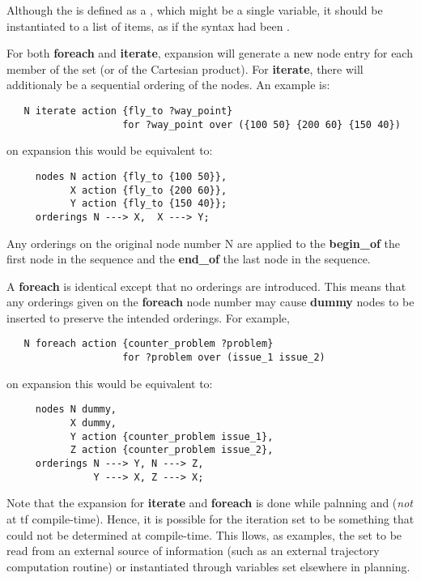 Although the  is defined as a ,
which might be a single variable, it should be instantiated to a list
of items, as if the syntax had been .

For both {\bf foreach} and {\bf iterate}, expansion will generate a
new node entry for each member of the set (or of the Cartesian
product).  For {\bf iterate}, there will additionaly be a sequential
ordering of the nodes.  An example is:

\begin{verbatim}
   N iterate action {fly_to ?way_point}
                    for ?way_point over ({100 50} {200 60} {150 40})
\end{verbatim}
on expansion this would be equivalent to:
\begin{verbatim}
     nodes N action {fly_to {100 50}},
           X action {fly_to {200 60}},
           Y action {fly_to {150 40}};
     orderings N ---> X,  X ---> Y;
\end{verbatim}

Any orderings on the original node number N are applied to the
{\bf begin\_of} the first node in the sequence and the {\bf end\_of} the
last node in the sequence.

A {\bf foreach} is identical except that no orderings are introduced.
This means that any orderings given on the {\bf foreach} node number may
cause {\bf dummy} nodes to be inserted to preserve the intended orderings.
For example,

\begin{verbatim}
   N foreach action {counter_problem ?problem}
                    for ?problem over (issue_1 issue_2)
\end{verbatim}
on expansion this would be equivalent to:
\begin{verbatim}
     nodes N dummy,
           X dummy,
           Y action {counter_problem issue_1},
           Z action {counter_problem issue_2},
     orderings N ---> Y, N ---> Z,
               Y ---> X, Z ---> X;
\end{verbatim}

Note that the expansion for {\bf iterate} and {\bf foreach} is done
while palnning and ({\em not} at {\sc tf} compile-time).  Hence, it is
possible for the iteration set to be something that could not be
determined at compile-time.  This llows, as examples, the set
to be read from an external source of information (such as an external
trajectory computation routine) or instantiated through variables set
elsewhere in planning.

